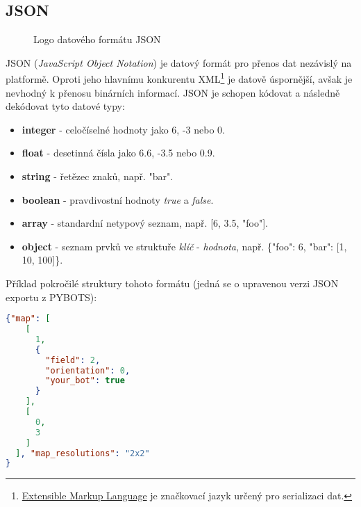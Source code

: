\subsection{JSON}
\label{subsec:json}

\begin{figure}%
    \centering
    
 	\caption{Logo datového formátu JSON}
\end{figure}

JSON (\emph{JavaScript Object Notation}) je datový formát pro přenos dat nezávislý na platformě. Oproti jeho hlavnímu konkurentu XML\footnote{\href{https://cs.wikipedia.org/wiki/Extensible_Markup_Language}{Extensible Markup Language} je značkovací jazyk určený pro serializaci dat.} je datově úspornější, avšak je nevhodný k přenosu binárních informací. JSON je schopen kódovat a následně dekódovat tyto datové typy:

\begin{itemize}
    \item
    \textbf{integer} - celočíselné hodnoty jako 6, -3 nebo 0.

    \item
    \textbf{float} - desetinná čísla jako 6.6, -3.5 nebo 0.9.

    \item
    \textbf{string} - řetězec znaků, např. "bar".

    \item
    \textbf{boolean} - pravdivostní hodnoty \textit{true} a \textit{false}.

    \item
    \textbf{array} - standardní netypový seznam, např. [6, 3.5, "foo"].

    \item
    \textbf{object} - seznam prvků ve struktuře \textit{klíč} - \textit{hodnota}, např. \{"foo": 6, "bar": [1, 10, 100]\}.
\end{itemize}

Příklad pokročilé struktury tohoto formátu (jedná se o upravenou verzi JSON exportu z PYBOTS):

\begin{lstlisting}[language=json,caption={Ukázka datového formátu JSON}]
 {"map": [
    [
      1,
      {
        "field": 2,
        "orientation": 0,
        "your_bot": true
      }
    ],
    [
      0,
      3
    ]
  ], "map_resolutions": "2x2"
}
\end{lstlisting}